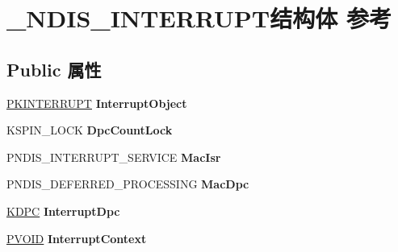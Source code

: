 \hypertarget{struct___n_d_i_s___i_n_t_e_r_r_u_p_t}{}\section{\+\_\+\+N\+D\+I\+S\+\_\+\+I\+N\+T\+E\+R\+R\+U\+P\+T结构体 参考}
\label{struct___n_d_i_s___i_n_t_e_r_r_u_p_t}
\subsection*{Public 属性}
\begin{DoxyCompactItemize}
\item 
\mbox{\label{struct___n_d_i_s___i_n_t_e_r_r_u_p_t_a5e1836796e13bc30e6ad74cf6e44625e}} 
\hyperlink{struct___k_i_n_t_e_r_r_u_p_t}{P\+K\+I\+N\+T\+E\+R\+R\+U\+PT} {\bfseries Interrupt\+Object}
\item 
\mbox{\label{struct___n_d_i_s___i_n_t_e_r_r_u_p_t_ac412bd0573181ac1ab706f961366f7ef}} 
K\+S\+P\+I\+N\+\_\+\+L\+O\+CK {\bfseries Dpc\+Count\+Lock}
\item 
\mbox{\label{struct___n_d_i_s___i_n_t_e_r_r_u_p_t_ae7e32d6fb85ffc5562c505a9204f33d1}} 
P\+N\+D\+I\+S\+\_\+\+I\+N\+T\+E\+R\+R\+U\+P\+T\+\_\+\+S\+E\+R\+V\+I\+CE {\bfseries Mac\+Isr}
\item 
\mbox{\label{struct___n_d_i_s___i_n_t_e_r_r_u_p_t_a9b76bd539f5aadf4d00b572eaa329e53}} 
P\+N\+D\+I\+S\+\_\+\+D\+E\+F\+E\+R\+R\+E\+D\+\_\+\+P\+R\+O\+C\+E\+S\+S\+I\+NG {\bfseries Mac\+Dpc}
\item 
\mbox{\label{struct___n_d_i_s___i_n_t_e_r_r_u_p_t_a07c869750c15a564509d92cb9e5ae543}} 
\hyperlink{struct___k_d_p_c}{K\+D\+PC} {\bfseries Interrupt\+Dpc}
\item 
\mbox{\label{struct___n_d_i_s___i_n_t_e_r_r_u_p_t_a32e5b73a9ca5356cd46b687fc1d91492}} 
\hyperlink{interfacevoid}{P\+V\+O\+ID} {\bfseries Interrupt\+Context}
\item 
\mbox{\label{struct___n_d_i_s___i_n_t_e_r_r_u_p_t_ad657e4fcb850429fe3f3a89f02365b6f}} 

\end{DoxyCompactItemize}
